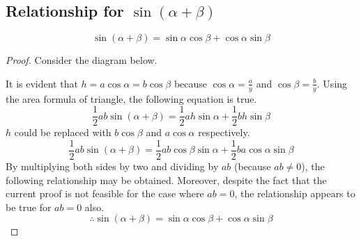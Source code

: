 \documentclass{article}
\begin{document}
\subsection{Relationship for $\sin(\alpha + \beta)$}
\[
\sin(\alpha + \beta)
= \sin\alpha \cos\beta + \cos\alpha \sin\beta
\]
\begin{proof}
Consider the diagram below.

\begin{center}
\end{center}

It is evident that $h = a\cos\alpha = b\cos\beta$
because $\cos\alpha = \frac{a}{y}$ and
$\cos\beta = \frac{b}{y}$.
Using the area formula of triangle, the following
equation is true.
\[
\frac{1}{2} ab \sin(\alpha + \beta)
= \frac{1}{2} ah \sin\alpha + \frac{1}{2} bh \sin\beta
\]
$h$ could be replaced with $b\cos\beta$ and
$a\cos\alpha$ respectively.
\[
\frac{1}{2} ab \sin(\alpha + \beta)
= \frac{1}{2} ab \cos\beta \sin\alpha +
    \frac{1}{2} ba \cos\alpha \sin\beta
\]
By multiplying both sides by two and dividing by
$ab$ (because $ab \neq 0$), the following relationship
may be obtained. Moreover, despite the fact that the
current proof is not feasible for the case where
$ab = 0$, the relationship appears to be true for
$ab = 0$ also. 
\[
\therefore \sin(\alpha + \beta)
= \sin\alpha \cos\beta + \cos\alpha \sin\beta
\]
\end{proof}
\end{document}

